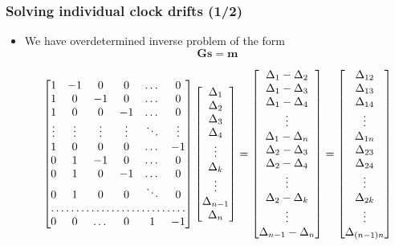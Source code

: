 \documentclass{beamer}
\begin{document}
\begin{frame}%
\frametitle{Solving individual clock drifts (1/2)}
\begin{itemize}
\item We have overdetermined inverse problem of the form
\begin{equation}
\bm{Gs} = \bm{m}
\end{equation}

\footnotesize
\begin{equation*}
\begin{bmatrix}
1 & -1 & 0 & 0 & \dots  & 0 \\
1 & 0 & -1 & 0 & \dots  & 0 \\
1 &  0  & 0 & -1 & \dots   & 0 \\
\vdots & \vdots & \vdots  & \vdots & \ddots & \vdots \\
1 &  0  & 0 & 0 & \dots & -1 \\
0 &  1  & -1 & 0 & \dots & 0 \\
0 & 1 & 0 & -1 & \dots & 0 \\
0 & 1 & 0 & 0 & \ddots & 0 \\
\hdotsfor{6} \\
0 & 0 & \dots & 0& 1 & -1
\end{bmatrix}
 \begin{bmatrix}
\Delta_1 \\ \Delta_2 \\ \Delta_3 \\ \Delta_4 \\ \vdots \\ \Delta_k \\ \vdots \\ \Delta_{n-1} \\ \Delta_n
\end{bmatrix}
 = 
 \begin{bmatrix}
 \Delta_1 - \Delta_2 \\ \Delta_1-\Delta_3 \\ \Delta_1-\Delta_4 \\ \vdots \\ \Delta_1 - \Delta_{n} \\ \Delta_2- \Delta_3 \\ \Delta_2 - \Delta_4 \\ \vdots  \\ \Delta_2-\Delta_k \\ \vdots \\ \Delta_{n-1} - \Delta_n
 \end{bmatrix}
= 
\begin{bmatrix}
\Delta_{12} \\ \Delta_{13} \\ \Delta_{14} \\ \vdots \\ \Delta_{1n} \\ \Delta_{23} \\ \Delta_{24} \\ \vdots \\ \Delta_{2k} \\ \vdots \\ \Delta_{(n-1)n}
\end{bmatrix} 
\end{equation*}
\normalsize


\end{itemize}
\end{frame}
\end{document}

